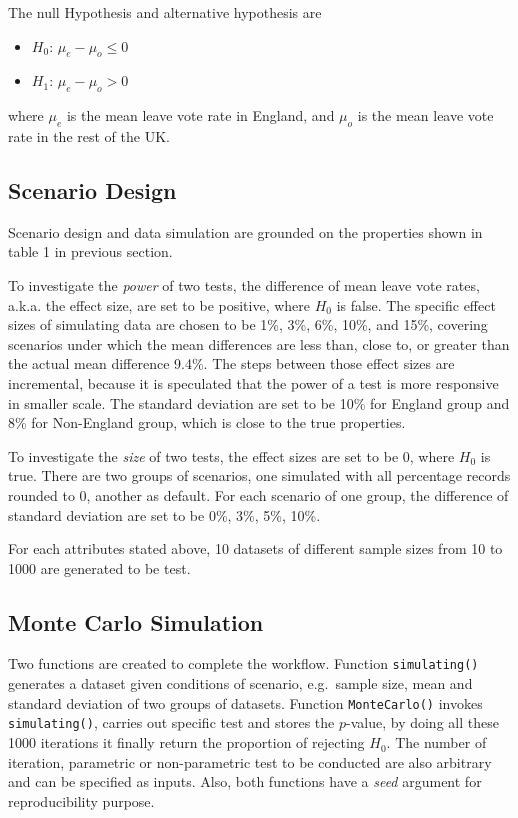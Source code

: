 \documentclass[]{article}
\begin{document}
The null Hypothesis and alternative hypothesis are

\begin{itemize}
\item
  \(H_0\): \(\mu_{e} - \mu_{o} \le 0\)
\item
  \(H_1\): \(\mu_{e} - \mu_{o} > 0\)
\end{itemize}

where \(\mu_{e}\) is the mean leave vote rate in England, and
\(\mu_{o}\) is the mean leave vote rate in the rest of the UK.

\hypertarget{scenario-design}{%
\subsection{Scenario Design}\label{scenario-design}}

Scenario design and data simulation are grounded on the properties shown
in table 1 in previous section.

To investigate the \emph{power} of two tests, the difference of mean
leave vote rates, a.k.a. the effect size, are set to be positive, where
\(H_0\) is false. The specific effect sizes of simulating data are
chosen to be 1\%, 3\%, 6\%, 10\%, and 15\%, covering scenarios under
which the mean differences are less than, close to, or greater than the
actual mean difference 9.4\%. The steps between those effect sizes are
incremental, because it is speculated that the power of a test is more
responsive in smaller scale. The standard deviation are set to be 10\%
for England group and 8\% for Non-England group, which is close to the
true properties.

To investigate the \emph{size} of two tests, the effect sizes are set to
be 0, where \(H_0\) is true. There are two groups of scenarios, one
simulated with all percentage records rounded to 0, another as default.
For each scenario of one group, the difference of standard deviation are
set to be 0\%, 3\%, 5\%, 10\%.

For each attributes stated above, 10 datasets of different sample sizes
from 10 to 1000 are generated to be test.

\hypertarget{monte-carlo-simulation}{%
\subsection{Monte Carlo Simulation}\label{monte-carlo-simulation}}

Two functions are created to complete the workflow. Function
\texttt{simulating()} generates a dataset given conditions of scenario,
e.g.~sample size, mean and standard deviation of two groups of datasets.
Function \texttt{MonteCarlo()} invokes \texttt{simulating()}, carries
out specific test and stores the \(p\)-value, by doing all these 1000
iterations it finally return the proportion of rejecting \(H_0\). The
number of iteration, parametric or non-parametric test to be conducted
are also arbitrary and can be specified as inputs. Also, both functions
have a \emph{seed} argument for reproducibility purpose.
\end{document}

